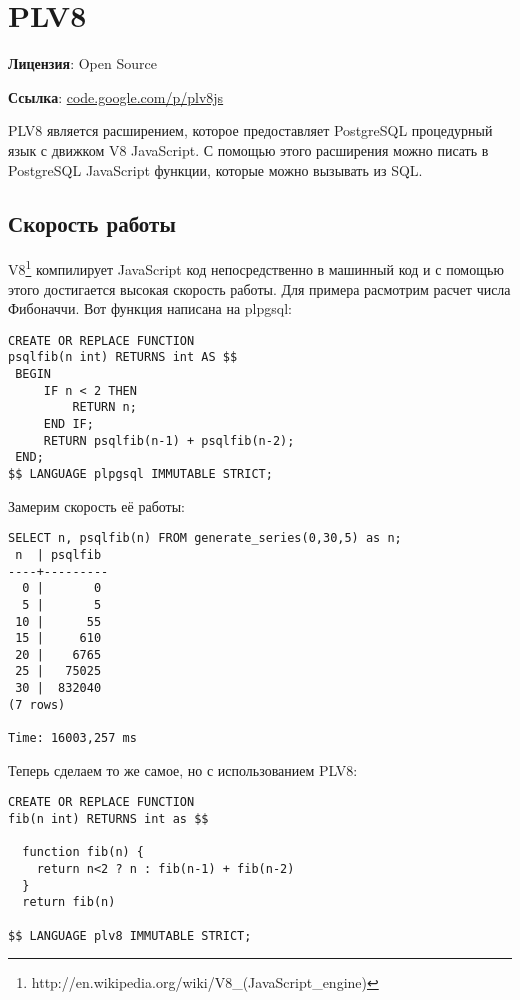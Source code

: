 \section{PLV8}
\textbf{Лицензия}: Open Source

\textbf{Ссылка}: \href{http://code.google.com/p/plv8js/}{code.google.com/p/plv8js}

PLV8 является расширением, которое предоставляет PostgreSQL процедурный язык с движком V8 JavaScript. С помощью этого расширения можно писать в PostgreSQL JavaScript функции, которые можно вызывать из SQL.

\subsection{Скорость работы}

V8\footnote{http://en.wikipedia.org/wiki/V8\_(JavaScript\_engine)} компилирует JavaScript код непосредственно в машинный код и с помощью этого достигается высокая скорость работы. Для примера расмотрим расчет числа Фибоначчи. Вот функция написана на plpgsql:

\begin{lstlisting}[label=lst:plv8js1,caption=Фибоначчи на plpgsql]
CREATE OR REPLACE FUNCTION
psqlfib(n int) RETURNS int AS $$
 BEGIN
     IF n < 2 THEN
         RETURN n;
     END IF;
     RETURN psqlfib(n-1) + psqlfib(n-2);
 END;
$$ LANGUAGE plpgsql IMMUTABLE STRICT;
\end{lstlisting}

Замерим скорость её работы:

\begin{lstlisting}[label=lst:plv8js2,caption=Скорость расчета числа Фибоначчи на plpgsql]
SELECT n, psqlfib(n) FROM generate_series(0,30,5) as n;
 n  | psqlfib 
----+---------
  0 |       0
  5 |       5
 10 |      55
 15 |     610
 20 |    6765
 25 |   75025
 30 |  832040
(7 rows)

Time: 16003,257 ms
\end{lstlisting}

Теперь сделаем то же самое, но с использованием PLV8:

\begin{lstlisting}[label=lst:plv8js3,caption=Фибоначчи на plv8]
CREATE OR REPLACE FUNCTION
fib(n int) RETURNS int as $$

  function fib(n) {
    return n<2 ? n : fib(n-1) + fib(n-2)
  }
  return fib(n)

$$ LANGUAGE plv8 IMMUTABLE STRICT;
\end{lstlisting}

